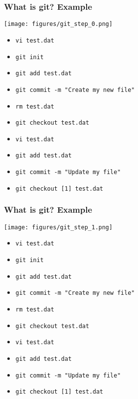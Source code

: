 \documentclass[xcolor=dvipsnames,10pt]{beamer}
\begin{document}
%
%
\begin{frame}
 \frametitle{What is git? Example}
 
 \begin{center}
  \texttt{[image: figures/git\_step\_0.png]}
 \end{center}
 \vspace*{-0.5cm}
 
 \begin{itemize}
  \color{white}
  \item[] \texttt{vi test.dat}
  \item[] \texttt{git init}
  \item[] \texttt{git add test.dat}
  \item[] \texttt{git commit -m "Create my new file"}
  \item[] \texttt{rm test.dat}
  \item[] \texttt{git checkout test.dat}
  \item[] \texttt{vi test.dat}
  \item[] \texttt{git add test.dat}
  \item[] \texttt{git commit -m "Update my file"}
  \item[] \texttt{git checkout [1] test.dat}
 \end{itemize}


\end{frame}
\addtocounter{framenumber}{-1}
\begin{frame}
 \frametitle{What is git? Example}
 
 \begin{center}
  \texttt{[image: figures/git\_step\_1.png]}
 \end{center}
 \vspace*{-0.5cm}
 
 \begin{itemize}
  \color{gray}
  \color{black}
  \item   \texttt{vi test.dat}
  \color{white}
  \item[] \texttt{git init}
  \item[] \texttt{git add test.dat}
  \item[] \texttt{git commit -m "Create my new file"}
  \item[] \texttt{rm test.dat}
  \item[] \texttt{git checkout test.dat}
  \item[] \texttt{vi test.dat}
  \item[] \texttt{git add test.dat}
  \item[] \texttt{git commit -m "Update my file"}
  \item[] \texttt{git checkout [1] test.dat}
 \end{itemize}


\end{frame}
\end{document}
